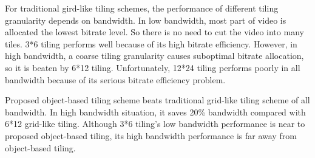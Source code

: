 For traditional gird-like tiling schemes, the performance of different tiling granularity depends on bandwidth. In low bandwidth, most part of video is allocated the lowest bitrate level. So there is no need to cut the video into many tiles. 3*6 tiling performs well because of its high bitrate efficiency. However, in high bandwidth, a coarse tiling granularity causes suboptimal bitrate allocation, so it is beaten by 6*12 tiling. Unfortunately, 12*24 tiling performs poorly in all bandwidth because of its serious bitrate efficiency problem.

Proposed object-based tiling scheme beats traditional grid-like tiling scheme of all bandwidth. In high bandwidth situation, it saves 20\% bandwidth compared with 6*12 grid-like tiling. Although 3*6 tiling's low bandwidth performance is near to proposed object-based tiling, its high bandwidth performance is far away from object-based tiling.

